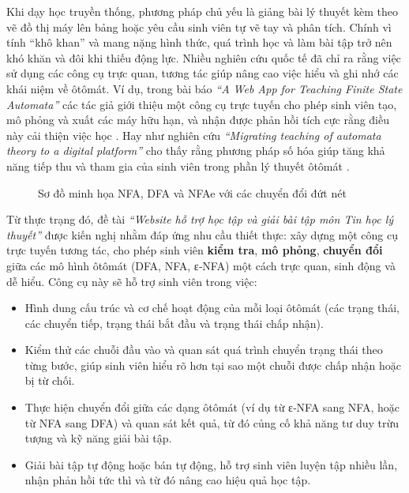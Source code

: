 \documentclass[12pt,a4paper]{report}
\begin{document}
Khi dạy học truyền thống, phương pháp chủ yếu là giảng bài lý thuyết kèm theo vẽ đồ thị máy lên bảng hoặc yêu cầu sinh viên tự vẽ tay và phân tích. Chính vì tính “khô khan” và mang nặng hình thức, quá trình học và làm bài tập trở nên khó khăn và đôi khi thiếu động lực. Nhiều nghiên cứu quốc tế đã chỉ ra rằng việc sử dụng các công cụ trực quan, tương tác giúp nâng cao việc hiểu và ghi nhớ các khái niệm về ôtômát. Ví dụ, trong bài báo \emph{``A Web App for Teaching Finite State Automata''} các tác giả giới thiệu một công cụ trực tuyến cho phép sinh viên tạo, mô phỏng và xuất các máy hữu hạn, và nhận được phản hồi tích cực rằng điều này cải thiện việc học \cite{webapp2024}. Hay như nghiên cứu \emph{``Migrating teaching of automata theory to a digital platform''} cho thấy rằng phương pháp số hóa giúp tăng khả năng tiếp thu và tham gia của sinh viên trong phần lý thuyết ôtômát \cite{digital2024}.


\begin{figure}[h!]
    \centering
    \caption{Sơ đồ minh họa NFA, DFA và NFAe với các chuyển đổi đứt nét}
    \label{fig:nfa_dfa_epsilon}
\end{figure}

Từ thực trạng đó, đề tài \emph{``Website hỗ trợ học tập và giải bài tập môn Tin học lý thuyết''} được kiến nghị nhằm đáp ứng nhu cầu thiết thực: xây dựng một công cụ trực tuyến tương tác, cho phép sinh viên \textbf{kiểm tra}, \textbf{mô phỏng}, \textbf{chuyển đổi} giữa các mô hình ôtômát (DFA, NFA, ε‑NFA) một cách trực quan, sinh động và dễ hiểu. Công cụ này sẽ hỗ trợ sinh viên trong việc:
\begin{itemize}
    \item Hình dung cấu trúc và cơ chế hoạt động của mỗi loại ôtômát (các trạng thái, các chuyển tiếp, trạng thái bắt đầu và trạng thái chấp nhận).  
    \item Kiểm thử các chuỗi đầu vào và quan sát quá trình chuyển trạng thái theo từng bước, giúp sinh viên hiểu rõ hơn tại sao một chuỗi được chấp nhận hoặc bị từ chối.  
    \item Thực hiện chuyển đổi giữa các dạng ôtômát (ví dụ từ ε‑NFA sang NFA, hoặc từ NFA sang DFA) và quan sát kết quả, từ đó củng cố khả năng tư duy trừu tượng và kỹ năng giải bài tập.  
    \item Giải bài tập tự động hoặc bán tự động, hỗ trợ sinh viên luyện tập nhiều lần, nhận phản hồi tức thì và từ đó nâng cao hiệu quả học tập.
\end{itemize}
\end{document}

